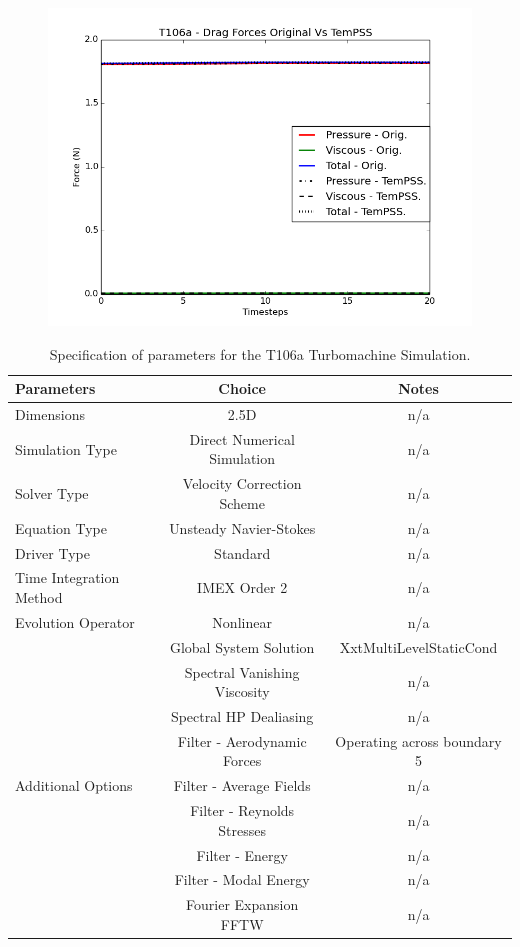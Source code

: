 \documentclass[11pt, a4paper]{report}
\begin{document}
\begin{figure}[htb!]
 \centering
 \includegraphics[width=.95\linewidth,  clip=true, trim = 0cm 0cm 0cm 0cm]{drag_t106a}
 \label{fig:drag_lift_t106a}
\end{figure}

\begin{table}[htb!]
	\centering
    \begin{tabular}{ l || c c}
    \hline
    Parameters & Choice & Notes \\
    \hline
    Dimensions & 2.5D & n/a\\
    Simulation Type & Direct Numerical Simulation & n/a\\
    Solver Type & Velocity Correction Scheme & n/a\\
    Equation Type & Unsteady Navier-Stokes & n/a\\
    Driver Type & Standard & n/a\\
    Time Integration Method & IMEX Order 2 & n/a\\
    Evolution Operator & Nonlinear & n/a\\   \hline
	 & Global System Solution & XxtMultiLevelStaticCond\\
	& Spectral Vanishing Viscosity & n/a\\
	& Spectral HP Dealiasing & n/a\\
	& Filter - Aerodynamic Forces & Operating across boundary 5\\
	Additional Options  & Filter - Average Fields & n/a\\
	& Filter - Reynolds Stresses & n/a\\
	& Filter - Energy & n/a\\
	& Filter - Modal Energy & n/a\\
	& Fourier Expansion FFTW & n/a\\
    \hline
    \end{tabular}
    \caption{Specification of parameters for the T106a Turbomachine Simulation.}
    \label{tab:t106a_parameters}
\end{table}
\end{document}
